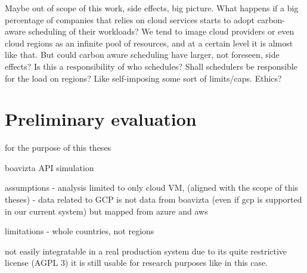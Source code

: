Maybe out of scope of this work, side effects, big picture.
What happens if a big percentage of companies that relies on cloud services starts to adopt carbon-aware scheduling of their workloads?
We tend to image cloud providers or even cloud regions as an infinite pool of resources, and at a certain level it is almost like that. But could carbon aware scheduling have larger, not foreseen, side effects?
Is this a responsibility of who schedules? Shall schedulers be responsible for the load on regions? Like self-imposing some sort of limits/caps. Ethics?

\section{Preliminary evaluation}

for the purpose of this theses

boavizta API simulation

assumptions
- analysis limited to only cloud VM, (aligned with the scope of this theses)
- data related to GCP is not data from boavizta (even if gcp is supported in our current system) but mapped from azure and aws

limitations
- whole countries, not regions


not easily integratable in a real production system due to its quite restrictive license (AGPL 3)
it is still usable for research purposes like in this case.







\newpage
